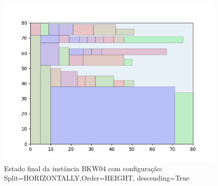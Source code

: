 \begin{figure}[H]
    \centering
    \caption[]{Estado final da instância BKW04 com configuração: Split=HORIZONTALLY,Order=HEIGHT, descending=True}
    \label{fig:bkw04-horizontally-height-true}
    \includegraphics[scale=0.5]{output/figures/bkw/bkw04/horizontally/height/true/00}
\end{figure}